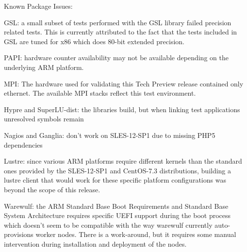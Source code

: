 \noindent Known Package Issues: 
\begin{itemize*}

\item GSL: a small subset of tests performed with the GSL library failed precision
related tests. This is currently attributed to the fact that the tests included
in GSL are tuned for x86 which does 80-bit extended precision.
\item PAPI: hardware counter availability may not be available depending on the
underlying ARM platform.
\item MPI: The hardware used for validating this Tech Preview release contained
only ethernet. The available MPI stacks reflect this test environment.
\item Hypre and SuperLU-dist: the libraries build, but when linking test
applications unresolved symbols remain
\item Nagios and Ganglia: don't work on SLES-12-SP1 due to missing PHP5
dependencies
\item Lustre: since various ARM platforms require different kernels than the
standard ones provided by the SLES-12-SP1 and CentOS-7.3 distributions,
building a lustre client that would work for these specific platform 
configurations was beyond the scope of this release.
\item Warewulf: the ARM Standard Base Boot Requirements and Standard Base System
Architecture requires specific UEFI support during the boot process which
doesn't seem to be compatible with the way warewulf currently auto-provisions
worker nodes. There is a work-around, but it requires some manual intervention
during installation and deployment of the nodes.
\end{itemize*}

